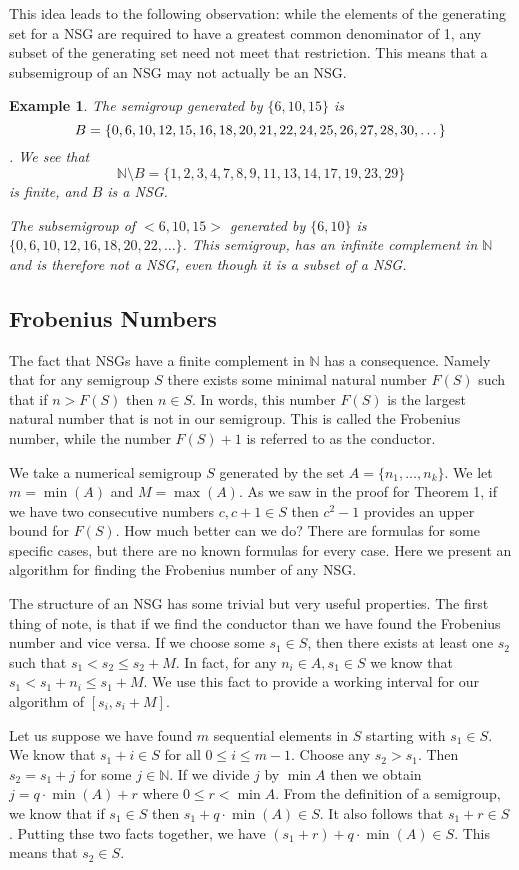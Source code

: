 \documentclass[11pt]{amsart}
\theoremstyle{plain}
\newtheorem{exa}{Example}
\theoremstyle{definition}
\begin{document}
This idea leads to the following observation: while the elements of the generating set for a NSG are required to have a greatest common denominator of 1, any subset of the generating set need not meet that restriction. This means that a subsemigroup of an NSG may not actually be an NSG.
\begin{exa}
  The semigroup generated by $\{6,10,15\}$ is $$B=\{0, 6, 10, 12, 15, 16, 18,
  20, 21, 22,\\ 24, 25, 26, 27, 28, 30, \dots \}$$. We see that $$\mathbb{N}\setminus
  B=\{1,2,3,4,7,8,9,11,13,
  14,17,19,23,29\}$$ is finite, and $B$ is a NSG.

  The subsemigroup of $<6,10,15>$ generated by $\{6,10\}$ is $\{0,6,10,12,16,18,20,22,\dots\}$. This semigroup, has an infinite complement in $\mathbb{N}$ and is therefore not a NSG, even though it is a subset of a NSG.
\end{exa}
\subsection{Frobenius Numbers}
The fact that NSGs have a finite complement in $\mathbb{N}$ has
a consequence. Namely that for any semigroup $S$ there exists some minimal
natural number $F(S)$ such that if $n>F(S)$ then $n\in S$. In words, this number
$F(S)$ is the largest natural number that is not in our semigroup. This is
called the Frobenius number, while the number $F(S)+1$ is referred to as
the conductor\cite{rosales}.

We take a numerical semigroup $S$ generated by the set $A=\{ n_1,\dots,n_k\}$. We let $m=\min(A)$ and $M=\max(A)$.
As we saw in the proof for Theorem 1, if we have two consecutive numbers $c,c+1\in S$ then $c^2-1$ provides an upper bound for $F(S)$.
How much better can we do?
There are formulas for some specific cases, but there are no known formulas for every case.
Here we present an algorithm for finding the Frobenius number of any NSG.

The structure of an NSG has some trivial but very useful properties.
The first thing of note, is that if we find the conductor than  we have found the Frobenius number and vice versa.
If we choose some $s_1\in S$, then there exists at least one $s_2$ such that
$s_1<s_2\le s_2+M$.
In fact, for any $n_i\in A,s_1\in S$ we know that $s_1<s_1+n_i\le s_1+M$.
We use this fact to provide a working interval for our algorithm of $[s_i,s_i+M]$.

Let us suppose we have found $m$ sequential elements in $S$ starting with $s_1\in S$.
We know that $s_1+i\in S$ for all $0\le i\le m-1$.
Choose any $s_2>s_1$. Then $s_2=s_1+j$ for some $j\in \mathbb{N}$.
If we divide $j$ by $\min A$ then we obtain $j=q\cdot\min(A)+r$ where $0\le r<\min A$.
From the definition of a semigroup, we know that if $s_1\in S$ then $s_1+q\cdot\min(A)\in S$.
It also follows that $s_1+r\in S$.
Putting thse two facts together, we have $(s_1+r)+q\cdot\min(A)\in S$.
This means that $s_2\in S$.
\end{document}
